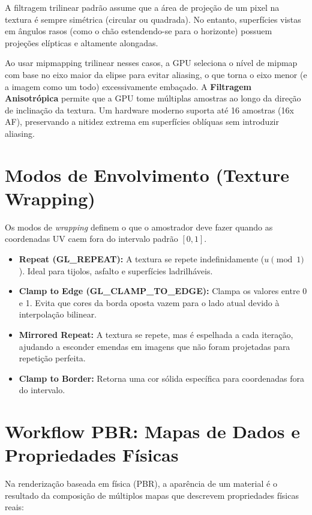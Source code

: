 A filtragem trilinear padrão assume que a área de projeção de um pixel na textura é sempre simétrica (circular ou quadrada). 
No entanto, superfícies vistas em ângulos rasos (como o chão estendendo-se para o horizonte) possuem projeções elípticas e altamente alongadas.

Ao usar mipmapping trilinear nesses casos, a GPU seleciona o nível de mipmap com base no eixo maior da elipse para evitar aliasing, o que torna o eixo menor (e a imagem como um todo) excessivamente embaçado. 
A \textbf{Filtragem Anisotrópica} permite que a GPU tome múltiplas amostras ao longo da direção de inclinação da textura. 
Um hardware moderno suporta até 16 amostras (16x AF), preservando a nitidez extrema em superfícies oblíquas sem introduzir aliasing.

\section{Modos de Envolvimento (Texture Wrapping)}

Os modos de \textit{wrapping} definem o que o amostrador deve fazer quando as coordenadas UV caem fora do intervalo padrão $[0, 1]$.

\begin{itemize}
    \item \textbf{Repeat (GL\_REPEAT):} A textura se repete indefinidamente ($u \pmod 1$). Ideal para tijolos, asfalto e superfícies ladrilháveis.
    \item \textbf{Clamp to Edge (GL\_CLAMP\_TO\_EDGE):} Clampa os valores entre 0 e 1. Evita que cores da borda oposta vazem para o lado atual devido à interpolação bilinear.
    \item \textbf{Mirrored Repeat:} A textura se repete, mas é espelhada a cada iteração, ajudando a esconder emendas em imagens que não foram projetadas para repetição perfeita.
    \item \textbf{Clamp to Border:} Retorna uma cor sólida específica para coordenadas fora do intervalo.
\end{itemize}

\section{Workflow PBR: Mapas de Dados e Propriedades Físicas}

Na renderização baseada em física (PBR), a aparência de um material é o resultado da composição de múltiplos mapas que descrevem propriedades físicas reais:

